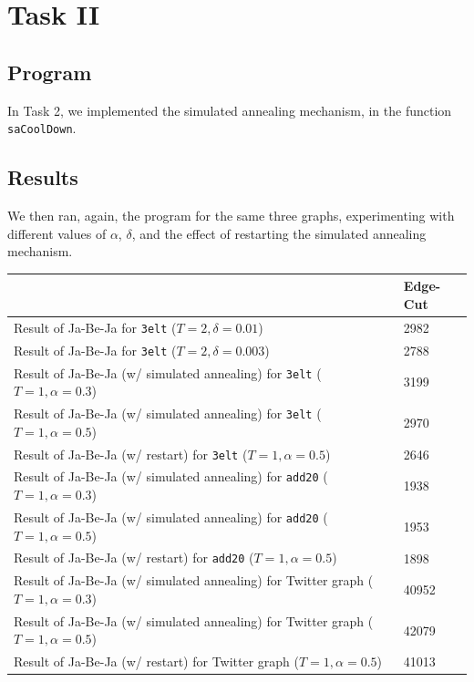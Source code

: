 \documentclass[]{article}
\begin{document}
\pagebreak

\section{Task II}

\subsection{Program}

In Task 2, we implemented the simulated annealing mechanism, in the function \texttt{saCoolDown}.

\subsection{Results}

We then ran, again, the program for the same three graphs, experimenting with different values of $\alpha$, $\delta$, and the effect of restarting the simulated annealing mechanism.

\begin{table}[!h]
\begin{tabular}{|l|l|}
\hline
                                                                                   & Edge-Cut \\ \hline
Result of Ja-Be-Ja for \texttt{3elt} ($T=2, \delta=0.01$)                          & 2982     \\ \hline
Result of Ja-Be-Ja for \texttt{3elt} ($T=2, \delta=0.003$)                         & 2788     \\ \hline
Result of Ja-Be-Ja (w/ simulated annealing) for \texttt{3elt} ($T=1, \alpha=0.3$)  & 3199     \\ \hline
Result of Ja-Be-Ja (w/ simulated annealing) for \texttt{3elt} ($T=1, \alpha=0.5$)  & 2970     \\ \hline
Result of Ja-Be-Ja (w/ restart) for \texttt{3elt} ($T=1, \alpha=0.5$)              & 2646     \\ \hline
Result of Ja-Be-Ja (w/ simulated annealing) for \texttt{add20} ($T=1, \alpha=0.3$) & 1938     \\ \hline
Result of Ja-Be-Ja (w/ simulated annealing) for \texttt{add20} ($T=1, \alpha=0.5$) & 1953     \\ \hline
Result of Ja-Be-Ja (w/ restart) for \texttt{add20} ($T=1, \alpha=0.5$)            & 1898     \\ \hline
Result of Ja-Be-Ja (w/ simulated annealing) for Twitter graph ($T=1, \alpha=0.3$)  & 40952    \\ \hline
Result of Ja-Be-Ja (w/ simulated annealing) for Twitter graph ($T=1, \alpha=0.5$)  & 42079    \\ \hline
Result of Ja-Be-Ja (w/ restart) for Twitter graph ($T=1, \alpha=0.5$)              & 41013    \\ \hline
\end{tabular}
\end{table}
\end{document}
